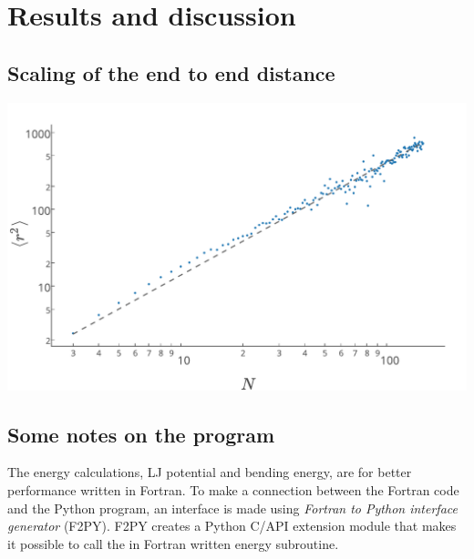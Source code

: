 \section{Results and discussion}

\subsection{Scaling of the end to end distance}
\begin{Figure}
\centering
\includegraphics[width=\linewidth]{r_squared.pdf}
\label{fig:r_squared}
\end{Figure}

\subsection{Some notes on the program}
The energy calculations, LJ potential and bending energy, are for better performance written in Fortran. To make a connection between the Fortran code and the Python program, an interface is made using \emph{Fortran to Python interface generator} (F2PY). F2PY creates a Python C/API extension module that makes it possible to call the in Fortran written energy subroutine.

